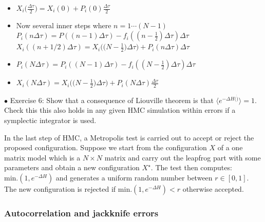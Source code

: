 \documentclass[11pt]{article}
\begin{document}
\begin{itemize}
	\item $X_{i}\big(\frac{\Delta \tau}{2}\big) = X_{i}(0) + P_{i}(0)\frac{\Delta \tau}{2}$
	\item Now several inner steps where $n =  1 \cdots (N-1)$
	\subitem $P_{i}(n \Delta \tau) = P((n-1) \Delta \tau) - f_{i}((n-\frac{1}{2}) \Delta \tau) \Delta \tau$ 
	\subitem $X_{i}((n + 1/2) \Delta \tau) = X_{i}\Big(\Big(N - \frac{1}{2}\Big) \Delta \tau\Big)  + P_{i}(n \Delta \tau) \Delta \tau$
	\item $P_{i}(N \Delta \tau) = P_{i}((N-1) \Delta \tau) - f_{i}((N-\frac{1}{2}) \Delta \tau) \Delta \tau$ 
	\item $X_{i}(N \Delta \tau) = X_{i}\Big(\Big(N - \frac{1}{2}\Big) \Delta \tau\Big) + P_{i}(N \Delta \tau) \frac{\Delta \tau}{2}$ 
	
\end{itemize} 


    \begin{mdframed}[backgroundcolor=blue!3] 
    \textsc{} 
    $\bullet$ Exercise 6: Show that a consequence of Liouville theorem is that $ \langle e^{-\Delta H(\dot)} \rangle = 1$. Check this this also holds in any given HMC simulation within errors if a symplectic integrator is used. 
    \end{mdframed} 
    

In the last step of HMC, a Metropolis test is carried out to accept or reject the proposed
configuration. Suppose we start from the configuration $X$ of a one matrix model 
which is a $N \times N$ matrix and carry out the leapfrog part with some parameters and obtain a new configuration 
$X^{\star}$. The test then computes: \texttt{$\text{min.}(1, e^{-\Delta H})$} and generates 
a uniform random number between $r \in [0,1]$. The new configuration is rejected if \texttt{$\text{min.}(1, e^{-\Delta H}) < r$} otherwise accepted. 



\subsubsection{Autocorrelation and jackknife errors} 
\end{document}
